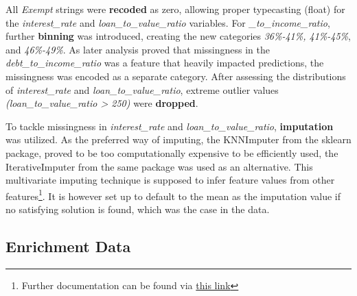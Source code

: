 All \textit{Exempt} strings were \textbf{recoded} as zero, allowing proper typecasting (float) for the \textit{interest\_rate} and \textit{loan\_to\_value\_ratio} variables. 
For \textit{\_to\_income\_ratio}, further \textbf{binning} was introduced, creating the new categories \textit{36\%-41\%, 41\%-45\%}, and \textit{46\%-49\%}. %
As later analysis proved that missingness in the \textit{debt\_to\_income\_ratio} was a feature that heavily impacted predictions, the missingness was encoded as a separate category.
After assessing the distributions of \textit{interest\_rate} and \textit{loan\_to\_value\_ratio}, extreme outlier values \textit{(loan\_to\_value\_ratio > 250)} were \textbf{dropped}. 

To tackle missingness in \textit{interest\_rate} and \textit{loan\_to\_value\_ratio}, \textbf{imputation} was utilized. 
As the preferred way of imputing, the KNNImputer from the sklearn package, proved to be too computationally expensive to be efficiently used, the IterativeImputer from the same package was used as an alternative. 
This multivariate imputing technique is supposed to infer feature values from other features\footnote{Further documentation can be found via \href{https://scikit-learn.org/stable/modules/generated/sklearn.impute.IterativeImputer.html}{this link}}. It is however set up to default to the mean as the imputation value if no satisfying solution is found, which was the case in the data.

\subsection{Enrichment Data}\label{subsec:Enrichment_Data}

